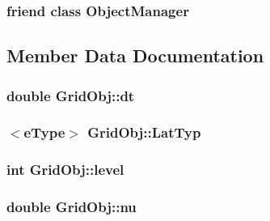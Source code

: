 \subsubsection[{\texorpdfstring{Object\+Manager}{ObjectManager}}]{\setlength{\rightskip}{0pt plus 5cm}friend class {\bf Object\+Manager}\hspace{0.3cm}{\ttfamily [friend]}}\hypertarget{class_grid_obj_a8b86bdcdb7c54a536293d8632363e114}{}\label{class_grid_obj_a8b86bdcdb7c54a536293d8632363e114}


\subsection{Member Data Documentation}
\subsubsection[{\texorpdfstring{dt}{dt}}]{\setlength{\rightskip}{0pt plus 5cm}double Grid\+Obj\+::dt}\hypertarget{class_grid_obj_afd504b39f12eb0a237bc6313de94e094}{}\label{class_grid_obj_afd504b39f12eb0a237bc6313de94e094}
\subsubsection[{\texorpdfstring{Lat\+Typ}{LatTyp}}]{$<${\bf e\+Type}$>$ Grid\+Obj\+::\+Lat\+Typ}\hypertarget{class_grid_obj_a8ce077fba648f767361039eb924c45ae}{}\label{class_grid_obj_a8ce077fba648f767361039eb924c45ae}
\subsubsection[{\texorpdfstring{level}{level}}]{\setlength{\rightskip}{0pt plus 5cm}int Grid\+Obj\+::level}\hypertarget{class_grid_obj_a7dfedc4442a386ec15c8b03ca899c1a9}{}\label{class_grid_obj_a7dfedc4442a386ec15c8b03ca899c1a9}
\subsubsection[{\texorpdfstring{nu}{nu}}]{\setlength{\rightskip}{0pt plus 5cm}double Grid\+Obj\+::nu}\hypertarget{class_grid_obj_a755f85eb5480d959211e00937a478ae9}{}\label{class_grid_obj_a755f85eb5480d959211e00937a478ae9}
